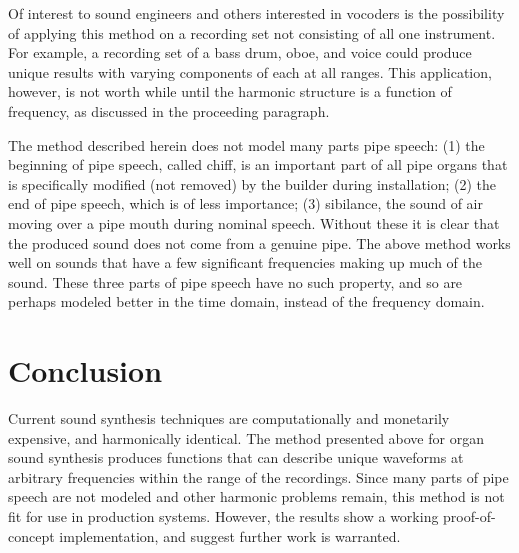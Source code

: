 \documentclass[twocolumn]{article}
\begin{document}
Of interest to sound engineers and others interested in vocoders is the possibility of applying this method on a recording set not consisting of all one instrument. For example, a recording set of a bass drum, oboe, and voice could produce unique results with varying components of each at all ranges. This application, however, is not worth while until the harmonic structure is a function of frequency, as discussed in the proceeding paragraph.

The method described herein does not model many parts pipe speech: (1) the beginning of pipe speech, called chiff, is an important part of all pipe organs that is specifically modified (not removed) by the builder during installation; (2) the end of pipe speech, which is of less importance; (3) sibilance, the sound of air moving over a pipe mouth during nominal speech. Without these it is clear that the produced sound does not come from a genuine pipe. The above method works well on sounds that have a few significant frequencies making up much of the sound. These three parts of pipe speech have no such property, and so are perhaps modeled better in the time domain, instead of the frequency domain.

\section{Conclusion}

Current sound synthesis techniques are computationally and monetarily expensive, and harmonically identical. The method presented above for organ sound synthesis produces functions that can describe unique waveforms at arbitrary frequencies within the range of the recordings. Since many parts of pipe speech are not modeled and other harmonic problems remain, this method is not fit for use in production systems. However, the results show a working proof-of-concept implementation, and suggest further work is warranted.
\end{document}
